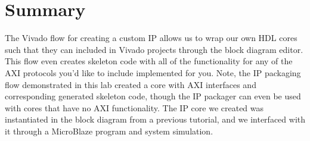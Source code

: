 \documentclass[11pt]{article}
\begin{document}
\section{Summary}
\label{sec:conc}
The Vivado flow for creating a custom IP allows us to wrap our own HDL cores such that they can included in Vivado projects through the block diagram editor. This flow even creates skeleton code with all of the functionality for any of the AXI protocols you'd like to include implemented for you. Note, the IP packaging flow demonstrated in this lab created a core with AXI interfaces and corresponding generated skeleton code, though the IP packager can even be used with cores that have no AXI functionality. The IP core we created was instantiated in the block diagram from a previous tutorial, and we interfaced with it through a MicroBlaze program and system simulation.
\end{document}
